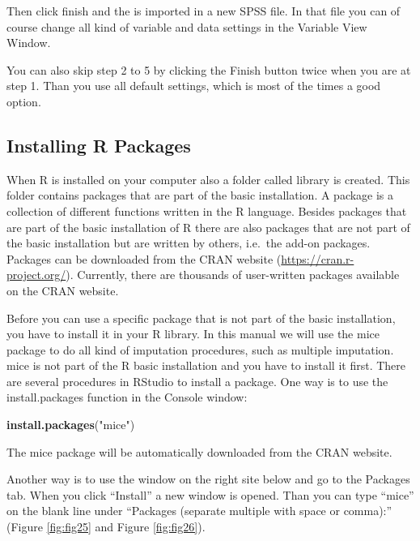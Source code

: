 \documentclass[]{book}
\newenvironment{Shaded}{\begin{snugshade}}{\end{snugshade}}
\newcommand{\KeywordTok}[1]{\textcolor[rgb]{0.13,0.29,0.53}{\textbf{#1}}}
\newcommand{\StringTok}[1]{\textcolor[rgb]{0.31,0.60,0.02}{#1}}
\newcommand{\NormalTok}[1]{#1}
\begin{document}
Then click finish and the is imported in a new SPSS file. In that file
you can of course change all kind of variable and data settings in the
Variable View Window.

You can also skip step 2 to 5 by clicking the Finish button twice when
you are at step 1. Than you use all default settings, which is most of
the times a good option.

\subsection{Installing R Packages}\label{installing-r-packages}

When R is installed on your computer also a folder called library is
created. This folder contains packages that are part of the basic
installation. A package is a collection of different functions written
in the R language. Besides packages that are part of the basic
installation of R there are also packages that are not part of the basic
installation but are written by others, i.e.~the add-on packages.
Packages can be downloaded from the CRAN website
(\url{https://cran.r-project.org/}). Currently, there are thousands of
user-written packages available on the CRAN website.

Before you can use a specific package that is not part of the basic
installation, you have to install it in your R library. In this manual
we will use the mice package to do all kind of imputation procedures,
such as multiple imputation. mice is not part of the R basic
installation and you have to install it first. There are several
procedures in RStudio to install a package. One way is to use the
install.packages function in the Console window:

\begin{Shaded}
\begin{Highlighting}[]
\KeywordTok{install.packages}\NormalTok{(}\StringTok{"mice"}\NormalTok{)}
\end{Highlighting}
\end{Shaded}

The mice package will be automatically downloaded from the CRAN website.

Another way is to use the window on the right site below and go to the
Packages tab. When you click ``Install'' a new window is opened. Than
you can type ``mice'' on the blank line under ``Packages (separate
multiple with space or comma):'' (Figure \ref{fig:fig25} and Figure
\ref{fig:fig26}).
\end{document}
